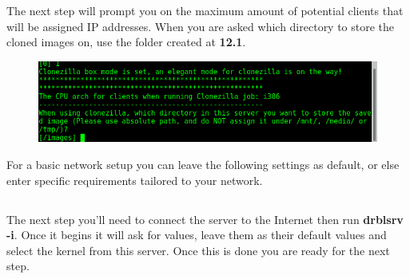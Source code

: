 \documentclass{article}
\begin{document}
\newline
The next step will prompt you on the maximum amount of potential clients that will be assigned IP addresses.
\newline \newline
When you are asked which directory to store the cloned images on, use the folder created at \textbf{12.1}.
\begin{figure}[h]
	\centering
	\includegraphics[width=1\linewidth]{"Screenshots-clone-server/Screenshot from 2018-03-10 13-40-31"}
\end{figure} \newline
For a basic network setup you can leave the following settings as default, or else enter specific requirements tailored to your network.
\newpage
\subsection{}
The next step you'll need to connect the server to the Internet then run \textbf{drblsrv -i}. Once it begins it will ask for values, leave them as their default values and select the kernel from this server. Once this is done you are ready for the next step.
\end{document}
